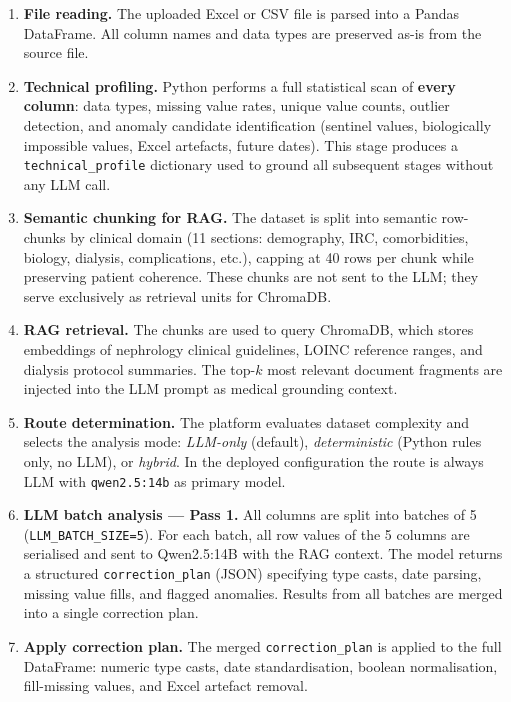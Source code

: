 \documentclass[12pt,a4paper,twoside]{report}
\begin{document}
\begin{description}
\begin{enumerate}

  \item \textbf{File reading.} The uploaded Excel or CSV file is parsed into a Pandas DataFrame. All column names and data types are preserved as-is from the source file.

  \item \textbf{Technical profiling.} Python performs a full statistical scan of \textbf{every column}: data types, missing value rates, unique value counts, outlier detection, and anomaly candidate identification (sentinel values, biologically impossible values, Excel artefacts, future dates). This stage produces a \texttt{technical\_profile} dictionary used to ground all subsequent stages without any LLM call.

  \item \textbf{Semantic chunking for RAG.} The dataset is split into semantic row-chunks by clinical domain (11 sections: demography, IRC, comorbidities, biology, dialysis, complications, etc.), capping at 40 rows per chunk while preserving patient coherence. These chunks are not sent to the LLM; they serve exclusively as retrieval units for ChromaDB.

  \item \textbf{RAG retrieval.} The chunks are used to query ChromaDB, which stores embeddings of nephrology clinical guidelines, LOINC reference ranges, and dialysis protocol summaries. The top-$k$ most relevant document fragments are injected into the LLM prompt as medical grounding context.

  \item \textbf{Route determination.} The platform evaluates dataset complexity and selects the analysis mode: \textit{LLM-only} (default), \textit{deterministic} (Python rules only, no LLM), or \textit{hybrid}. In the deployed configuration the route is always LLM with \texttt{qwen2.5:14b} as primary model.

  \item \textbf{LLM batch analysis — Pass 1.} All columns are split into batches of 5 (\texttt{LLM\_BATCH\_SIZE=5}). For each batch, all row values of the 5 columns are serialised and sent to Qwen2.5:14B with the RAG context. The model returns a structured \texttt{correction\_plan} (JSON) specifying type casts, date parsing, missing value fills, and flagged anomalies. Results from all batches are merged into a single correction plan.

  \item \textbf{Apply correction plan.} The merged \texttt{correction\_plan} is applied to the full DataFrame: numeric type casts, date standardisation, boolean normalisation, fill-missing values, and Excel artefact removal.


\end{enumerate}
\end{description}
\end{document}
